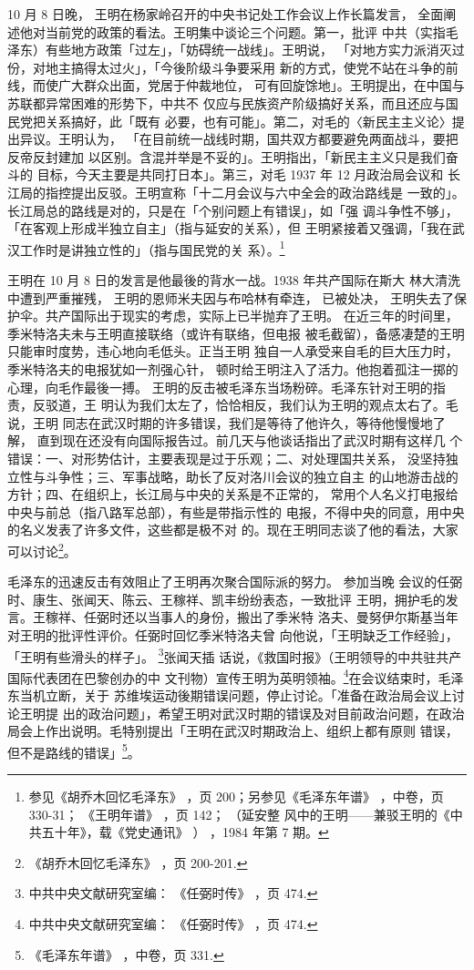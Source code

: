10 月 8 日晚，
王明在杨家岭召开的中央书记处工作会议上作长篇发言，
全面阐述他对当前党的政策的看法。王明集中谈论三个问题。第一，批评
中共（实指毛泽东）有些地方政策「过左」，「妨碍统一战线」。王明说，
「对地方实力派消灭过份，对地主搞得太过火」，「今後阶级斗争要采用
新的方式，使党不站在斗争的前线，而使广大群众出面，党居于仲裁地位，
可有回旋馀地」。王明提出，在中国与苏联都异常困难的形势下，中共不
仅应与民族资产阶级搞好关系，而且还应与国民党把关系搞好，此「既有
必要，也有可能」。第二，对毛的〈新民主主义论〉提出异议。王明认为，
「在目前统一战线时期，国共双方都要避免两面战斗，要把反帝反封建加
以区别。含混并举是不妥的」。王明指出，「新民主主义只是我们奋斗的
目标，今天主要是共同打日本」。第三，对毛 1937 年 12 月政治局会议和
长江局的指控提出反驳。王明宣称「十二月会议与六中全会的政治路线是
一致的」。长江局总的路线是对的，只是在「个别问题上有错误」，如「强
调斗争性不够」，「在客观上形成半独立自主」（指与延安的关系），但
王明紧接着又强调，「我在武汉工作时是讲独立性的」（指与国民党的关
系）。\footnote{参见《胡乔木回忆毛泽东》
，页 200；另参见《毛泽东年谱》
，中卷，页 330-31；
《王明年谱》
，页 142；
（延安整
风中的王明——兼驳王明的《中共五十年》，载《党史通讯》
）
，1984 年第 7 期。
}

王明在 10 月 8 日的发言是他最後的背水一战。1938 年共产国际在斯大
林大清洗中遭到严重摧残，
王明的恩师米夫因与布哈林有牵连，
已被处决，
王明失去了保护伞。共产国际出于现实的考虑，实际上已半抛弃了王明。
在近三年的时间里，季米特洛夫未与王明直接联络（或许有联络，但电报
被毛截留），备感凄楚的王明只能审时度势，违心地向毛低头。正当王明
独自一人承受来自毛的巨大压力时，季米特洛夫的电报犹如一剂强心针，
顿时给王明注入了活力。他抱着孤注一掷的心理，向毛作最後一搏。
王明的反击被毛泽东当场粉碎。毛泽东针对王明的指责，反驳道，王
明认为我们太左了，恰恰相反，我们认为王明的观点太右了。毛说，王明
同志在武汉时期的许多错误，我们是等待了他许久，等待他慢慢地了解，
直到现在还没有向国际报告过。前几天与他谈话指出了武汉时期有这样几
个错误：一、对形势估计，主要表现是过于乐观；二、对处理国共关系，
没坚持独立性与斗争性；三、军事战略，助长了反对洛川会议的独立自主
的山地游击战的方针；四、在组织上，长江局与中央的关系是不正常的，
常用个人名义打电报给中央与前总（指八路军总部），有些是带指示性的
电报，不得中央的同意，用中央的名义发表了许多文件，这些都是极不对
的。现在王明同志谈了他的看法，大家可以讨论\footnote{《胡乔木回忆毛泽东》
，页 200-201.}。

毛泽东的迅速反击有效阻止了王明再次聚合国际派的努力。
参加当晚
会议的任弼时、康生、张闻天、陈云、王稼祥、凯丰纷纷表态，一致批评
王明，拥护毛的发言。王稼祥、任弼时还以当事人的身份，搬出了季米特
洛夫、曼努伊尔斯基当年对王明的批评性评价。任弼时回忆季米特洛夫曾
向他说，「王明缺乏工作经验」，「王明有些滑头的样子」。
\footnote{中共中央文献研究室编：
《任弼时传》
，页 474.}张闻天插
话说，《救国时报》（王明领导的中共驻共产国际代表团在巴黎创办的中
文刊物）宣传王明为英明领袖。\footnote{中共中央文献研究室编：
《任弼时传》
，页 474.}在会议结束时，毛泽东当机立断，关于
苏维埃运动後期错误问题，停止讨论。「准备在政治局会议上讨论王明提
出的政治问题」，希望王明对武汉时期的错误及对目前政治问题，在政治
局会上作出说明。毛特别提出「王明在武汉时期政治上、组织上都有原则
错误，但不是路线的错误」\footnote{《毛泽东年谱》
，中卷，页 331.}。

